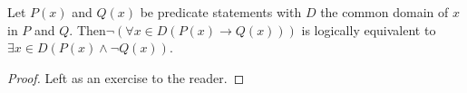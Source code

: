\guard





\begin{prop}
\label{prop:negationOfUniversalConditionalStatement}
  Let $P(x)$ and $Q(x)$ be predicate statements with $D$ the common domain of $x$ in $P$ and $Q$.
  Then$\neg\left(\forall x\in D(P(x)\rightarrow Q(x))\right)$ is logically equivalent to $\exists x\in D(P(x) \wedge \neg Q(x) )$.
\end{prop}
\begin{proof}
  Left as an exercise to the reader.
\end{proof}
